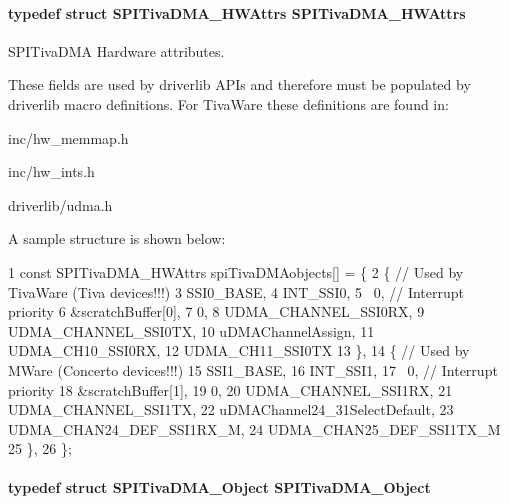 \paragraph[{S\+P\+I\+Tiva\+D\+M\+A\+\_\+\+H\+W\+Attrs}]{\setlength{\rightskip}{0pt plus 5cm}typedef struct {\bf S\+P\+I\+Tiva\+D\+M\+A\+\_\+\+H\+W\+Attrs}  {\bf S\+P\+I\+Tiva\+D\+M\+A\+\_\+\+H\+W\+Attrs}}\label{_s_p_i_tiva_d_m_a_8h_ab2566f4cb348d144220085b8fad1dee6}


S\+P\+I\+Tiva\+D\+M\+A Hardware attributes. 

These fields are used by driverlib A\+P\+Is and therefore must be populated by driverlib macro definitions. For Tiva\+Ware these definitions are found in\+:
\begin{DoxyItemize}
\item inc/hw\+\_\+memmap.\+h
\item inc/hw\+\_\+ints.\+h
\item driverlib/udma.\+h
\end{DoxyItemize}

A sample structure is shown below\+: 
\begin{DoxyCode}
1 const SPITivaDMA\_HWAttrs spiTivaDMAobjects[] = \{
2     \{   // Used by TivaWare (Tiva devices!!!)
3         SSI0\_BASE,
4         INT\_SSI0,
5         ~0,         // Interrupt priority
6         &scratchBuffer[0],
7         0,
8         UDMA\_CHANNEL\_SSI0RX,
9         UDMA\_CHANNEL\_SSI0TX,
10         uDMAChannelAssign,
11         UDMA\_CH10\_SSI0RX,
12         UDMA\_CH11\_SSI0TX
13     \},
14     \{   // Used by MWare (Concerto devices!!!)
15         SSI1\_BASE,
16         INT\_SSI1,
17         ~0,         // Interrupt priority
18         &scratchBuffer[1],
19         0,
20         UDMA\_CHANNEL\_SSI1RX,
21         UDMA\_CHANNEL\_SSI1TX,
22         uDMAChannel24\_31SelectDefault,
23         UDMA\_CHAN24\_DEF\_SSI1RX\_M,
24         UDMA\_CHAN25\_DEF\_SSI1TX\_M
25     \},
26 \};
\end{DoxyCode}
\paragraph[{S\+P\+I\+Tiva\+D\+M\+A\+\_\+\+Object}]{\setlength{\rightskip}{0pt plus 5cm}typedef struct {\bf S\+P\+I\+Tiva\+D\+M\+A\+\_\+\+Object}  {\bf S\+P\+I\+Tiva\+D\+M\+A\+\_\+\+Object}}\label{_s_p_i_tiva_d_m_a_8h_aa431693a87cbc8cced0555e211d34c2b}



